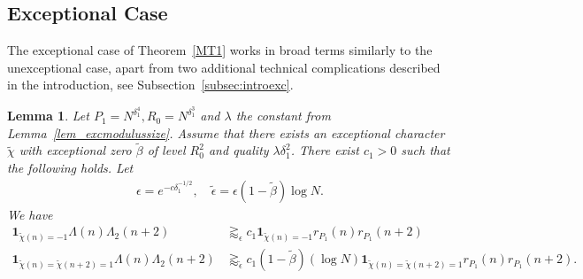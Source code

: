 \documentclass[12pt]{amsart}
\newtheorem{lemma}[theorem]{Lemma}
\theoremstyle{definition}
\theoremstyle{remark}
\numberwithin{equation}{section}
\newcommand{\1}{\mathbf{1}}
\begin{document}
			\subsection{Exceptional Case}
			The exceptional case of Theorem~\ref{MT1} works in broad terms similarly to the unexceptional case, apart from two additional technical complications described in the introduction, see Subsection~\ref{subsec:introexc}.

			\begin{lemma}\label{lem_finalex}
             Let $P_1=N^{\delta_1^4},R_0=N^{\delta_1^3}$ and $\lambda$ the constant from Lemma~\ref{lem_excmodulussize}.
				Assume that there exists an exceptional character $\widetilde{\chi}$ with exceptional zero $\widetilde{\beta}$ of level $R_0^2$ and quality $\lambda\delta_1^2$. There exist $c_1>0$ such that the following holds. Let 
				\begin{align*}
					\epsilon = e^{-c \delta_1^{-1/2}},\quad 
					\widetilde{\epsilon}=\epsilon (1-\widetilde{\beta}) \log N.
				\end{align*}
				We have
				\begin{align}
					\1_{\widetilde{\chi}(n)=-1} \label{eq_lem_finalex_1} \Lambda(n)\Lambda_2(n+2)&\gtrapprox_{\epsilon} c_1 \1_{\widetilde{\chi}(n)=-1} r_{P_1}(n)r_{P_1}(n+2)\\
					\1_{\widetilde{\chi}(n)=\widetilde{\chi}(n+2)=1}\Lambda(n)\Lambda_2(n+2)&\gtrapprox_{\widetilde{\epsilon}} c_1 (1-\widetilde{\beta}) (\log N) \1_{\widetilde{\chi}(n)=\widetilde{\chi}(n+2)=1} r_{P_1}(n)r_{P_1}(n+2). \label{eq_lem_finalex_2} 
				\end{align}
			\end{lemma}
			
\end{document}
